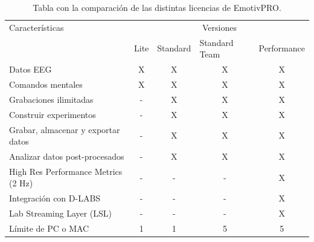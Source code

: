 \begin{table}[H]
\centering
\begin{tabular}{lcccc}
\rowcolor[HTML]{FFFFFF} 
Características & \multicolumn{4}{c}{\cellcolor[HTML]{FFFFFF}Versiones} \\
\rowcolor[HTML]{FFFFFF} 
 & \multicolumn{1}{l}{\cellcolor[HTML]{FFFFFF}Lite} & \multicolumn{1}{l}{\cellcolor[HTML]{FFFFFF}Standard} & \multicolumn{1}{l}{\cellcolor[HTML]{FFFFFF}Standard Team} & \multicolumn{1}{l}{\cellcolor[HTML]{FFFFFF}Performance} \\
\rowcolor[HTML]{FFFFFF} 
Datos EEG & \cellcolor[HTML]{FFFFFF}X & X & X & X \\
\rowcolor[HTML]{FFFFFF} 
Comandos mentales & X & X & X & X \\
\rowcolor[HTML]{FFFFFF} 
Grabaciones ilimitadas & \cellcolor[HTML]{FFFFFF}- & X & X & X \\
\rowcolor[HTML]{FFFFFF} 
Construir experimentos & \cellcolor[HTML]{FFFFFF}- & X & X & X \\
\rowcolor[HTML]{FFFFFF} 
Grabar, almacenar y exportar datos & \cellcolor[HTML]{FFFFFF}- & X & X & X \\
\rowcolor[HTML]{FFFFFF} 
Analizar datos post-procesados & \cellcolor[HTML]{FFFFFF}- & X & X & X \\
\rowcolor[HTML]{FFFFFF} 
\cellcolor[HTML]{FFFFFF}High Res Performance Metrics (2 Hz) & - & - & - & \cellcolor[HTML]{FFFFFF}X \\
\rowcolor[HTML]{FFFFFF} 
\cellcolor[HTML]{FFFFFF}Integración con D-LABS & - & - & - & \cellcolor[HTML]{FFFFFF}X \\
\rowcolor[HTML]{FFFFFF} 
\cellcolor[HTML]{FFFFFF}Lab Streaming Layer (LSL) & - & - & - & \cellcolor[HTML]{FFFFFF}X \\
\rowcolor[HTML]{FFFFFF} 
Límite de PC o MAC & 1 & 1 & 5 & 5
\end{tabular}
\caption{Tabla con la comparación de las distintas licencias de EmotivPRO.}
\label{tab:comparacionLicencias}
\end{table}

